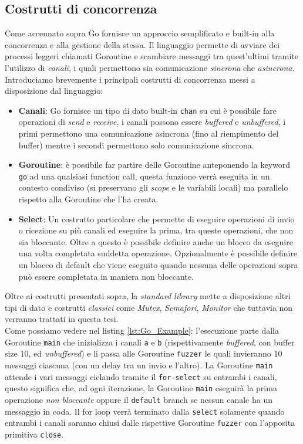 \subsection{Costrutti di concorrenza}
Come accennato sopra Go fornisce un approccio semplificato e built-in alla concorrenza e alla gestione della stessa. Il linguaggio permette di avviare dei processi leggeri chiamati Goroutine e scambiare messaggi tra quest'ultimi tramite l'utilizzo di \emph{canali}, i quali permettono sia comunicazione \emph{sincrona} che \emph{asincrona}.\\
Introduciamo brevemente i principali costrutti di concorrenza messi a disposizione dal linguaggio:
\begin{itemize}
    \item \textbf{Canali}: Go fornisce un tipo di dato built-in \texttt{chan} su cui è possibile fare operazioni di \emph{send} e \emph{receive}, i canali possono essere \emph{buffered} e \emph{unbuffered}, i primi permettono una comunicazione asincrona (fino al riempimento del buffer) mentre i secondi permettono solo comunicazione sincrona.
    \item \textbf{Goroutine}: è possibile far partire delle Goroutine anteponendo la keyword \texttt{go} ad una qualsiasi function call, questa funzione verrà eseguita in un contesto condiviso (si preservano gli \emph{scope} e le variabili locali) ma parallelo rispetto alla Goroutine che l'ha creata.
    \item \textbf{Select}: Un costrutto particolare che permette di eseguire operazioni di invio o ricezione su più canali ed eseguire la prima, tra queste operazioni, che non sia bloccante. Oltre a questo è possibile definire anche un blocco da eseguire una volta completata suddetta operazione. Opzionalmente è possibile definire un blocco di default che viene eseguito quando nessuna delle operazioni sopra può essere completata in maniera non bloccante.
\end{itemize}
Oltre ai costrutti presentati sopra, la \emph{standard library} mette a disposizione altri tipi di dato e costrutti \emph{classici} come \emph{Mutex}, \emph{Semafori}, \emph{Monitor} che tuttavia non verranno trattati in questa tesi. \bigskip \\
Come possiamo vedere nel listing \ref{lst:Go_Example}: l'esecuzione parte dalla Goroutine \texttt{main} che inizializza i canali \texttt{a} e \texttt{b} (rispettivamente \emph{buffered}, con buffer size 10, ed \emph{unbuffered}) e li passa alle Goroutine \texttt{fuzzer} le quali invieranno 10 messaggi ciascuna (con un delay tra un invio e l'altro). La Goroutine \texttt{main} attende i vari messaggi ciclando tramite il \texttt{for-select} su entrambi i canali, questo significa che, ad ogni iterazione, la Goroutine \texttt{main} eseguirà la prima operazione \emph{non bloccante} oppure il \texttt{default} branch se nessun canale ha un messaggio in coda. Il for loop verrà terminato dalla \texttt{select} solamente quando entrambi i canali saranno chiusi dalle rispettive Goroutine \texttt{fuzzer} con l'apposita primitiva \texttt{close}.


